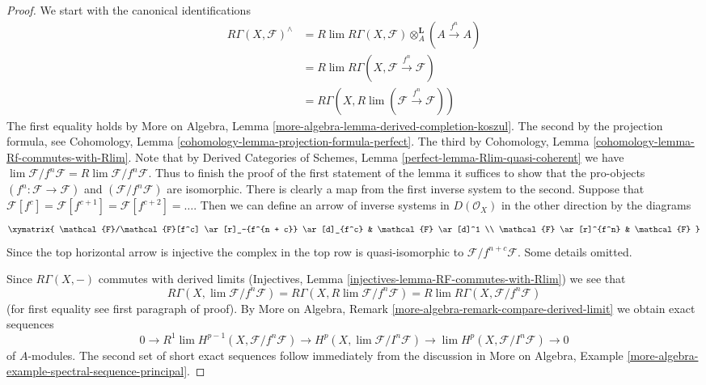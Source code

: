 \begin{proof}
We start with the canonical identifications
\begin{align*}
R\Gamma(X, \mathcal{F})^\wedge
& =
R\lim R\Gamma(X, \mathcal{F}) \otimes_A^\mathbf{L} (A \xrightarrow{f^n} A) \\
& =
R\lim R\Gamma(X, \mathcal{F} \xrightarrow{f^n} \mathcal{F}) \\
& =
R\Gamma(X, R\lim (\mathcal{F} \xrightarrow{f^n} \mathcal{F}))
\end{align*}
The first equality holds by
More on Algebra, Lemma \ref{more-algebra-lemma-derived-completion-koszul}.
The second by the projection formula, see 
Cohomology, Lemma \ref{cohomology-lemma-projection-formula-perfect}.
The third by Cohomology, Lemma
\ref{cohomology-lemma-Rf-commutes-with-Rlim}.
Note that by
Derived Categories of Schemes, Lemma \ref{perfect-lemma-Rlim-quasi-coherent}
we have
$\lim \mathcal{F}/f^n\mathcal{F} = R\lim \mathcal{F}/f^n \mathcal{F}$.
Thus to finish the proof of the first statement of the lemma it suffices to
show that the pro-objects $(f^n : \mathcal{F} \to \mathcal{F})$
and $(\mathcal{F}/f^n \mathcal{F})$ are isomorphic. There is clearly
a map from the first inverse system to the second. Suppose that
$\mathcal{F}[f^c] = \mathcal{F}[f^{c + 1}] = \mathcal{F}[f^{c + 2}] = \ldots$.
Then we can define an arrow of inverse systems in $D(\mathcal{O}_X)$
in the other direction by the diagrams
$$
\xymatrix{
\mathcal{F}/\mathcal{F}[f^c] \ar[r]_-{f^{n + c}} \ar[d]_{f^c} &
\mathcal{F} \ar[d]^1 \\
\mathcal{F} \ar[r]^{f^n} & \mathcal{F}
}
$$
Since the top horizontal arrow is injective the complex
in the top row is quasi-isomorphic to $\mathcal{F}/f^{n + c}\mathcal{F}$.
Some details omitted.

\medskip\noindent
Since $R\Gamma(X, -)$ commutes with derived limits
(Injectives, Lemma \ref{injectives-lemma-RF-commutes-with-Rlim})
we see that
$$
R\Gamma(X, \lim \mathcal{F}/f^n\mathcal{F}) =
R\Gamma(X, R\lim \mathcal{F}/f^n\mathcal{F}) =
R\lim R\Gamma(X, \mathcal{F}/f^n\mathcal{F})
$$
(for first equality see first paragraph of proof).
By More on Algebra, Remark \ref{more-algebra-remark-compare-derived-limit}
we obtain exact sequences
$$
0 \to
R^1\lim H^{p - 1}(X, \mathcal{F}/f^n\mathcal{F}) \to
H^p(X, \lim \mathcal{F}/I^n\mathcal{F}) \to
\lim H^p(X, \mathcal{F}/I^n\mathcal{F}) \to 0
$$
of $A$-modules. The second set of short exact sequences follow immediately
from the discussion in More on Algebra, Example
\ref{more-algebra-example-spectral-sequence-principal}.
\end{proof}








